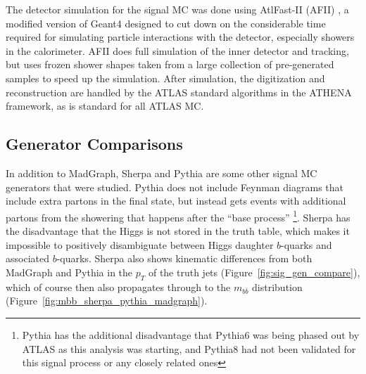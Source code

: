 The detector simulation for the signal MC was done using AtlFast-II (AFII) \cite{ATF2}, 
a modified version of Geant4 \cite{Geant4-1, Geant4-2} designed 
to cut down on the considerable time required for simulating particle interactions with the detector, especially 
showers in the calorimeter.  AFII does full simulation of the inner detector and tracking, but 
uses frozen shower shapes taken from a large collection of pre-generated samples to speed up 
the simulation.  After simulation, the digitization and reconstruction are handled by the ATLAS standard algorithms 
in the ATHENA framework, as is standard for all ATLAS MC.    



\subsection{Generator Comparisons}
In addition to MadGraph, Sherpa and Pythia are some other signal MC generators that 
were studied.  Pythia does not include Feynman diagrams that include extra partons 
in the final state, but instead gets events with additional partons from the showering
that happens after the ``base process'' \footnote{Pythia has the additional disadvantage
that Pythia6 was being phased out by ATLAS as this analysis was starting, and Pythia8 
had not been validated for this signal process or any closely related ones}.  
Sherpa has the disadvantage that
the Higgs is not stored in the truth table, which makes it impossible to positively
disambiguate between Higgs daughter $b$-quarks and associated $b$-quarks.  Sherpa
also shows kinematic differences from both MadGraph and Pythia in the $p_T$ of the truth
jets (Figure~\ref{fig:sig_gen_compare}), which of course then also propagates through to the $m_{b\bar{b}}$ distribution
(Figure~\ref{fig:mbb_sherpa_pythia_madgraph}).


